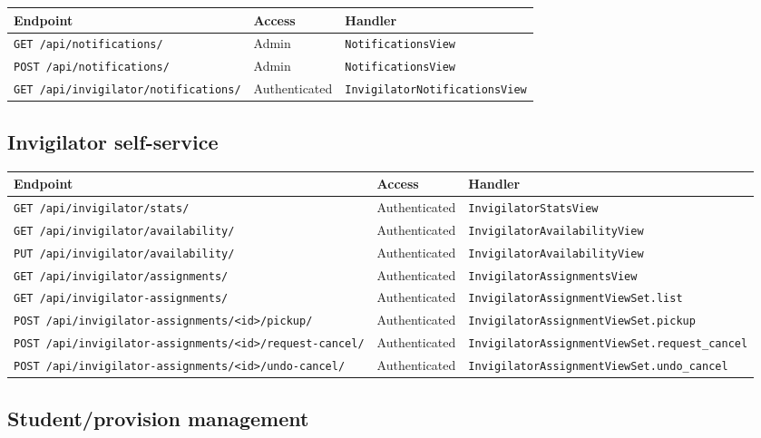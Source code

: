 \begin{longtable}{p{}p{}p{}}
\toprule
\textbf{Endpoint} & \textbf{Access} & \textbf{Handler} \\
\midrule
\texttt{GET /api/notifications/} & Admin & \texttt{NotificationsView} \\
\texttt{POST /api/notifications/} & Admin & \texttt{NotificationsView} \\
\texttt{GET /api/invigilator/notifications/} & Authenticated & \texttt{InvigilatorNotificationsView} \\
\bottomrule
\end{longtable}

\subsection{Invigilator self-service}
\label{subsec:api:endpoints:invigilator}

\begin{longtable}{p{}p{}p{}}
\toprule
\textbf{Endpoint} & \textbf{Access} & \textbf{Handler} \\
\midrule
\texttt{GET /api/invigilator/stats/} & Authenticated & \texttt{InvigilatorStatsView} \\
\texttt{GET /api/invigilator/availability/} & Authenticated & \texttt{InvigilatorAvailabilityView} \\
\texttt{PUT /api/invigilator/availability/} & Authenticated & \texttt{InvigilatorAvailabilityView} \\
\texttt{GET /api/invigilator/assignments/} & Authenticated & \texttt{InvigilatorAssignmentsView} \\
\texttt{GET /api/invigilator-assignments/} & Authenticated & \texttt{InvigilatorAssignmentViewSet.list} \\
\texttt{POST /api/invigilator-assignments/<id>/pickup/} & Authenticated & \texttt{InvigilatorAssignmentViewSet.pickup} \\
\texttt{POST /api/invigilator-assignments/<id>/request-cancel/} & Authenticated & \texttt{InvigilatorAssignmentViewSet.request\_cancel} \\
\texttt{POST /api/invigilator-assignments/<id>/undo-cancel/} & Authenticated & \texttt{InvigilatorAssignmentViewSet.undo\_cancel} \\
\bottomrule
\end{longtable}

\subsection{Student/provision management}
\label{subsec:api:endpoints:students}


